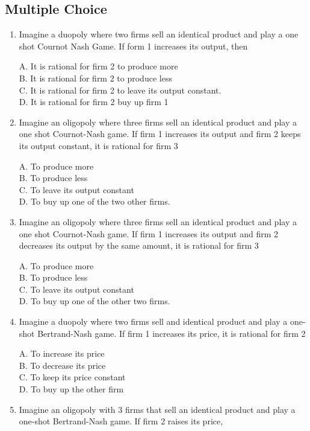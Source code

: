 \documentclass[
]{book}
\begin{document}
\hypertarget{multiple-choice-9}{%
\subsection{Multiple Choice}\label{multiple-choice-9}}

\begin{enumerate}
\def\labelenumi{\arabic{enumi}.}
\item
  Imagine a duopoly where two firms sell an identical product and play a one shot Cournot Nash Game. If form 1 increases its output, then

  A. It is rational for firm 2 to produce more\\
  B. It is rational for firm 2 to produce less\\
  C. It is rational for firm 2 to leave its output constant.\\
  D. It is rational for firm 2 buy up firm 1
\item
  Imagine an oligopoly where three firms sell an identical product and play a one shot Cournot-Nash game. If firm 1 increases its output and firm 2 keeps its output constant, it is rational for firm 3

  A. To produce more\\
  B. To produce less\\
  C. To leave its output constant\\
  D. To buy up one of the two other firms.
\item
  Imagine an oligopoly where three firms sell an identical product and play a one shot Cournot-Nash game. If firm 1 increases its output and firm 2 decreases its output by the same amount, it is rational for firm 3

  A. To produce more\\
  B. To produce less\\
  C. To leave its output constant\\
  D. To buy up one of the other two firms.
\item
  Imagine a duopoly where two firms sell and identical product and play a one-shot Bertrand-Nash game. If firm 1 increases its price, it is rational for firm 2

  A. To increase its price\\
  B. To decrease its price\\
  C. To keep its price constant\\
  D. To buy up the other firm
\item
  Imagine an oligopoly with 3 firms that sell an identical product and play a one-shot Bertrand-Nash game. If firm 2 raises its price,


\end{enumerate}
\end{document}
